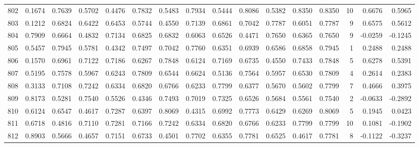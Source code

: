 \begin{tabular}{lrrrrrrrrrrrrrrr}
802 &      0.1674 &  0.7639 &  0.5702 &  0.4476 &  0.7832 &  0.5483 &  0.7934 &  0.5444 &  0.8086 &  0.5382 &   0.8350 &     0.8350 &     10 &                    0.6676 &                     0.5965 \\
803 &      0.1212 &  0.6824 &  0.6422 &  0.6453 &  0.5744 &  0.4550 &  0.7139 &  0.6861 &  0.7042 &  0.7787 &   0.6051 &     0.7787 &      9 &                    0.6575 &                     0.5612 \\
804 &      0.7909 &  0.6664 &  0.4832 &  0.7134 &  0.6825 &  0.6832 &  0.6063 &  0.6526 &  0.4471 &  0.7650 &   0.6365 &     0.7650 &      9 &                   -0.0259 &                    -0.1245 \\
805 &      0.5457 &  0.7945 &  0.5781 &  0.4342 &  0.7497 &  0.7042 &  0.7760 &  0.6351 &  0.6939 &  0.6586 &   0.6858 &     0.7945 &      1 &                    0.2488 &                     0.2488 \\
806 &      0.1570 &  0.6961 &  0.7122 &  0.7186 &  0.6267 &  0.7848 &  0.6124 &  0.7169 &  0.6735 &  0.4550 &   0.7433 &     0.7848 &      5 &                    0.6278 &                     0.5391 \\
807 &      0.5195 &  0.7578 &  0.5967 &  0.6243 &  0.7809 &  0.6544 &  0.6624 &  0.5136 &  0.7564 &  0.5957 &   0.6530 &     0.7809 &      4 &                    0.2614 &                     0.2383 \\
808 &      0.3133 &  0.7108 &  0.7242 &  0.6334 &  0.6820 &  0.6766 &  0.6233 &  0.7799 &  0.6377 &  0.5670 &   0.5602 &     0.7799 &      7 &                    0.4666 &                     0.3975 \\
809 &      0.8173 &  0.5281 &  0.7540 &  0.5526 &  0.4346 &  0.7493 &  0.7019 &  0.7325 &  0.6526 &  0.5684 &   0.5561 &     0.7540 &      2 &                   -0.0633 &                    -0.2892 \\
810 &      0.6124 &  0.6547 &  0.4617 &  0.7287 &  0.6397 &  0.8069 &  0.4315 &  0.6992 &  0.7773 &  0.6429 &   0.6269 &     0.8069 &      5 &                    0.1945 &                     0.0423 \\
811 &      0.6718 &  0.4816 &  0.7110 &  0.7281 &  0.7166 &  0.7242 &  0.6334 &  0.6820 &  0.6766 &  0.6233 &   0.7799 &     0.7799 &     10 &                    0.1081 &                    -0.1902 \\
812 &      0.8903 &  0.5666 &  0.4657 &  0.7151 &  0.6733 &  0.4501 &  0.7702 &  0.6355 &  0.7781 &  0.6525 &   0.4617 &     0.7781 &      8 &                   -0.1122 &                    -0.3237 \\

\end{tabular}
